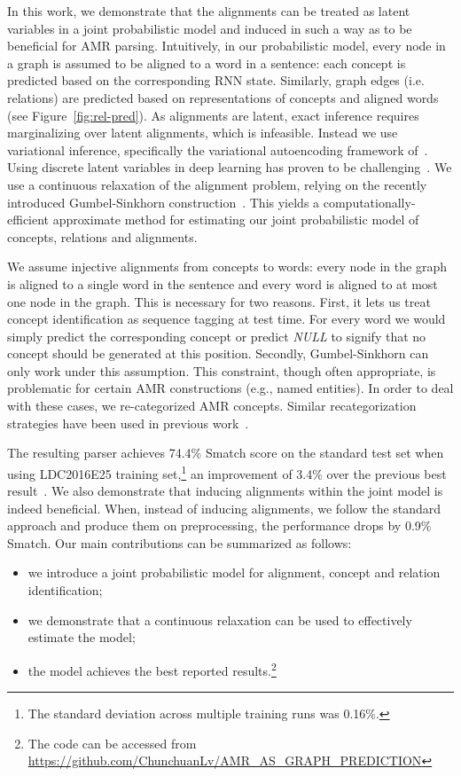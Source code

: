 \documentclass[11pt,a4paper]{article}
\begin{document}
In this work, we demonstrate that the alignments can be treated as latent variables in a joint probabilistic model and induced in such a way as to be beneficial for AMR parsing.
Intuitively, in our probabilistic model, every node in a graph is assumed to be aligned to a word in a sentence: each concept is predicted based on the corresponding RNN state.
Similarly, graph edges (i.e. relations) are predicted based on representations of concepts and aligned words (see Figure~\ref{fig:rel-pred}). As alignments are latent, exact inference requires marginalizing over latent alignments, which is infeasible. Instead we use variational inference, specifically the variational autoencoding framework of~. Using discrete latent variables in deep learning has proven to be challenging~\cite{mnih2014neural,bornschein2015reweighted}.  We use a continuous relaxation of the alignment problem, relying on the recently introduced Gumbel-Sinkhorn construction~\cite{sinkhorn}.
This yields a computationally-efficient approximate method for estimating our joint probabilistic model of concepts, relations and alignments.

We assume injective alignments from concepts to words: every node in the graph is aligned to a single word in the sentence and every word is aligned to at most one node in the graph. 
This is necessary for two reasons. First, it lets us treat concept identification as sequence tagging at test time. For every word we would simply predict the corresponding concept or predict {\it NULL} to signify that no concept should be generated at this position.
Secondly, Gumbel-Sinkhorn can only work under this 
assumption. This constraint, though often appropriate, is problematic for certain AMR constructions  (e.g., named entities). In order to deal with these cases, we re-categorized AMR concepts. Similar recategorization strategies have been used in previous work~\cite{foland-martin:2017:Long,peng2017addressing}. 


The resulting parser achieves 74.4\% Smatch score on the standard test set when using LDC2016E25 training set,\footnote{The standard deviation across multiple training runs was 0.16\%.} 
an improvement of 3.4\% over the previous best result~\cite{Character}. 
We also demonstrate that inducing alignments within the joint model is indeed beneficial. When, instead  of inducing alignments, 
we follow the standard approach and produce them on preprocessing,  the performance drops by 0.9\% Smatch.
Our main contributions can be summarized as
follows:
\begin{itemize}
\item we introduce a joint probabilistic model for alignment, concept and relation identification;
\item we demonstrate that a continuous relaxation can be used to effectively estimate the model;
\item the model achieves the best reported results.\footnote{The code can be accessed from \url{https://github.com/ChunchuanLv/AMR_AS_GRAPH_PREDICTION}}
\end{itemize}
\end{document}
